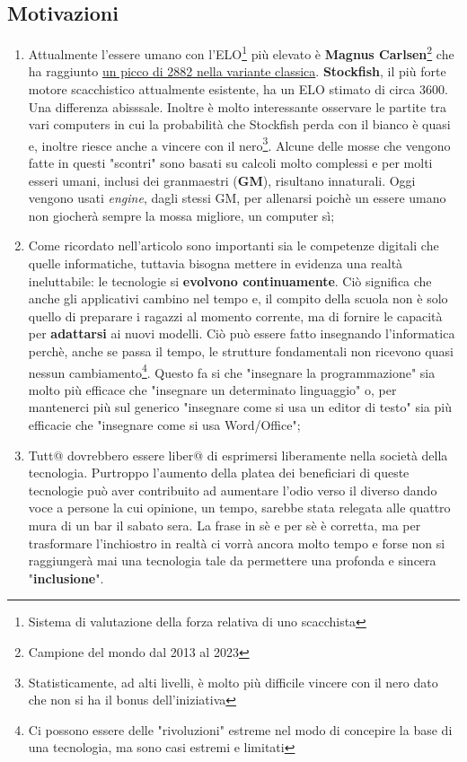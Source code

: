 \subsection{Motivazioni}
\begin{enumerate}
    \item Attualmente l'essere umano con l'ELO\footnote{Sistema di valutazione della forza relativa di uno scacchista} più elevato è \textbf{Magnus Carlsen}\footnote{Campione del mondo dal 2013 al 2023} che ha raggiunto \href{https://www.chess.com/it/article/view/magnus-carlsen-campione-mondo-scacchi-retrospettiva#elo}{un picco di 2882 nella variante classica}. \textbf{Stockfish}, il più forte motore scacchistico attualmente esistente, ha un ELO stimato di circa 3600. Una differenza abisssale. Inoltre è molto interessante osservare le partite tra vari computers in cui la probabilità che Stockfish perda con il bianco è quasi e, inoltre riesce anche a vincere con il nero\footnote{Statisticamente, ad alti livelli, è molto più difficile vincere con il nero dato che non si ha il bonus dell'iniziativa}. Alcune delle mosse che vengono fatte in questi "scontri" sono basati su calcoli molto complessi e per molti esseri umani, inclusi dei granmaestri (\textbf{GM}), risultano innaturali. Oggi vengono usati \textit{engine}, dagli stessi GM, per allenarsi poichè un essere umano non giocherà sempre la mossa migliore, un computer sì;
    \item Come ricordato nell'articolo sono importanti sia le competenze digitali che quelle informatiche, tuttavia bisogna mettere in evidenza una realtà ineluttabile: le tecnologie si \textbf{evolvono continuamente}. Ciò significa che anche gli applicativi cambino nel tempo e, il compito della scuola non è solo quello di preparare i ragazzi al momento corrente, ma di fornire le capacità per \textbf{adattarsi} ai nuovi modelli. Ciò può essere fatto insegnando l'informatica perchè, anche se passa il tempo, le strutture fondamentali non ricevono quasi nessun cambiamento\footnote{Ci possono essere delle "rivoluzioni" estreme nel modo di concepire la base di una tecnologia, ma sono casi estremi e limitati}. Questo fa si che "insegnare la programmazione" sia molto più efficace che "insegnare un determinato linguaggio" o, per mantenerci più sul generico "insegnare come si usa un editor di testo" sia più efficacie che "insegnare come si usa Word/Office";
    \item Tutt@  dovrebbero essere liber@ di esprimersi liberamente nella società della tecnologia. Purtroppo l'aumento della platea dei beneficiari di queste tecnologie può aver contribuito ad aumentare l'odio verso il diverso dando voce a persone la cui opinione, un tempo, sarebbe stata relegata alle quattro mura di un bar il sabato sera. La frase in sè e per sè è corretta, ma per trasformare l'inchiostro in realtà ci vorrà ancora molto tempo e forse non si raggiungerà mai una tecnologia tale da permettere una profonda e sincera "\textbf{inclusione}".
\end{enumerate}

